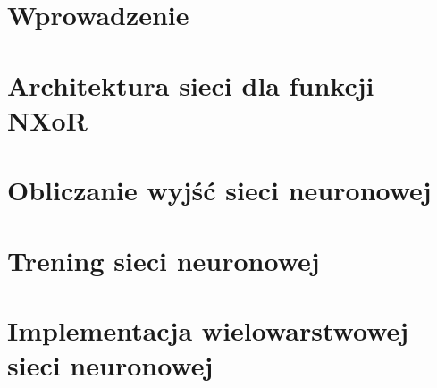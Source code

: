  



\maketitle
\tableofcontents{}
\newpage


\section{Wprowadzenie}
 

\section{Architektura sieci dla funkcji NXoR}
 


\section{Obliczanie wyjść sieci neuronowej}
 

\section{Trening sieci neuronowej}
 

\section{Implementacja wielowarstwowej sieci neuronowej}
 



